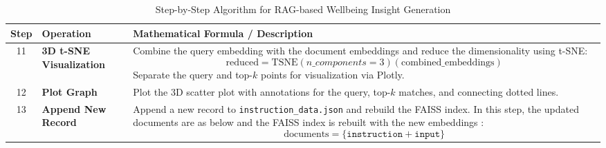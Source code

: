 \begin{table}[H]
    \centering
    \caption*{Step-by-Step Algorithm for RAG-based Wellbeing Insight Generation}
    \label{tab:algorithm}
    \begin{tabularx}{\textwidth}{|c|p{2.5cm}|X|}
        \hline
        \textbf{Step} & \textbf{Operation} & \textbf{Mathematical Formula / Description} \\ \hline
    
        11 & \textbf{3D t-SNE} \newline \textbf{Visualization} & Combine the query embedding with the document embeddings and reduce the dimensionality using t-SNE:
        \[
        \text{reduced} = \text{TSNE}(n\_components=3)(\text{combined\_embeddings})
        \]
        Separate the query and top-\(k\) points for visualization via Plotly. \\ \hline
        
        12 & \textbf{Plot Graph} & Plot the 3D scatter plot with annotations for the query, top-\(k\) matches, and connecting dotted lines. \\ \hline
        
        13 & \textbf{Append New Record} & Append a new record to \texttt{instruction\_data.json} and rebuild the FAISS index. In this step, the updated documents are as below and the FAISS index is rebuilt with the new embeddings :
        \vspace{-0.5cm}
        \[
        \text{documents} = \{ \texttt{instruction} + \texttt{input} \}
        \]
        \vspace{-0.5cm}
         \\ \hline
    \end{tabularx}
\end{table}

\vspace{-0.7cm}

